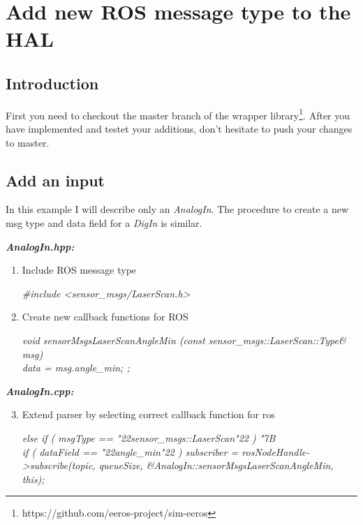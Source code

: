 

\section{Add new ROS message type to the HAL}
\label{sectionImplementMsgType}
\subsection{Introduction}
First you need to checkout the master branch of the wrapper library\footnote{https://github.com/eeros-project/sim-eeros}.
After you have implemented and testet your additions, don't hesitate to push your changes to master.

\subsection{Add an input}
In this example I will describe only an \textit{AnalogIn}.
The procedure to create a new msg type and data field for a \textit{DigIn} is similar.

\textbf{\textit{AnalogIn.hpp:}}
\begin{enumerate}
	\item Include ROS message type
	\begin{snugshade*}
		\textit{\#include <sensor\_msgs/LaserScan.h>}
	\end{snugshade*}
	
	\item Create new callback functions for ROS
	\begin{snugshade*}
		\textit{void sensorMsgsLaserScanAngleMin		(const sensor\_msgs::LaserScan::Type\& msg)	\\
			{data = msg.angle\_min;} ;
		}
	\end{snugshade*}
\end{enumerate}

\textbf{\textit{AnalogIn.cpp:}}
\begin{enumerate}
	\setcounter{enumi}{2}
	\item Extend parser by selecting correct callback function for ros
	\begin{snugshade*}
		\textit{else if ( msgType == \char"22sensor\_msgs::LaserScan\char"22 ) \char"7B\\
			\-\hspace{1cm}if 		( dataField == \char"22angle\_min\char"22 )
			subscriber = rosNodeHandle->subscribe(topic, queueSize, \&AnalogIn::sensorMsgsLaserScanAngleMin, this);
		}
	\end{snugshade*}
\end{enumerate}

